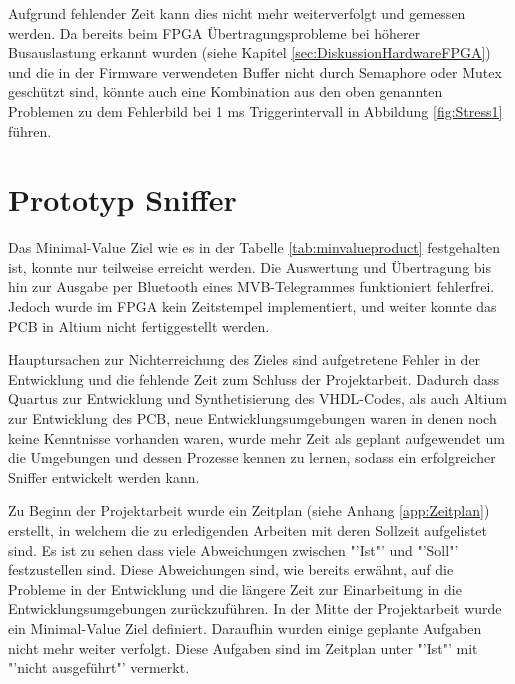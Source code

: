 Aufgrund fehlender Zeit kann dies nicht mehr weiterverfolgt und gemessen werden. Da bereits beim FPGA Übertragungsprobleme bei höherer Busauslastung erkannt wurden (siehe Kapitel \ref{sec:DiskussionHardwareFPGA}) und die in der Firmware verwendeten Buffer nicht durch Semaphore oder Mutex geschützt sind, könnte auch eine Kombination aus den oben genannten Problemen zu dem Fehlerbild bei 1 ms Triggerintervall in Abbildung \ref{fig:Stress1} führen.


\section{Prototyp Sniffer}
\label{sec:DiskussionSniffer}
Das Minimal-Value Ziel wie es in der Tabelle \ref{tab:minvalueproduct} festgehalten ist, konnte nur teilweise erreicht werden. Die Auswertung und Übertragung bis hin zur Ausgabe per Bluetooth eines MVB-Telegrammes funktioniert fehlerfrei. Jedoch wurde im FPGA kein Zeitstempel implementiert, und weiter konnte das PCB in Altium nicht fertiggestellt werden.

Hauptursachen zur Nichterreichung des Zieles sind aufgetretene Fehler in der Entwicklung und die fehlende Zeit zum Schluss der Projektarbeit. Dadurch dass Quartus zur Entwicklung und Synthetisierung des VHDL-Codes, als auch Altium zur Entwicklung des PCB, neue Entwicklungsumgebungen waren in denen noch keine Kenntnisse vorhanden waren, wurde mehr Zeit als geplant aufgewendet um die Umgebungen und dessen Prozesse kennen zu lernen, sodass ein erfolgreicher Sniffer entwickelt werden kann.

Zu Beginn der Projektarbeit wurde ein Zeitplan (siehe Anhang \ref{app:Zeitplan}) erstellt, in welchem die zu erledigenden Arbeiten mit deren Sollzeit aufgelistet sind. Es ist zu sehen dass viele Abweichungen zwischen "'Ist"' und "'Soll"' festzustellen sind. Diese Abweichungen sind, wie bereits erwähnt, auf die Probleme in der Entwicklung und die längere Zeit zur Einarbeitung in die Entwicklungsumgebungen zurückzuführen. In der Mitte der Projektarbeit wurde ein Minimal-Value Ziel definiert. Daraufhin wurden einige geplante Aufgaben nicht mehr weiter verfolgt. Diese Aufgaben sind im Zeitplan unter "'Ist"' mit "'nicht ausgeführt"' vermerkt.
